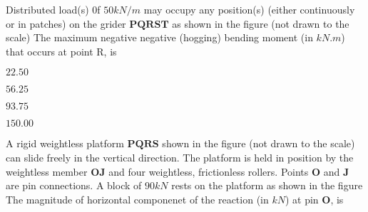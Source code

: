 \item Distributed load(s) 0f $ 50 k N/m $ may occupy any position(s) (either continuously or in patches) on the grider $\textbf{PQRST}$ as shown in the figure (not drawn to the scale)
The maximum negative negative (hogging) bending moment (in $k N. m$) that occurs at point R, is 
\begin{center}
\end{center}

\begin{enumerate}
\begin{multicols}{4}
    \item $22.50$
    \item $56.25$
    \item $93.75$
    \item $150.00$
\end{multicols}
\end{enumerate}
\item A rigid weightless platform $\textbf{PQRS}$ shown in the figure (not drawn to the scale)  can slide freely in the vertical direction. The platform is held in position by the weightless member $\textbf{OJ}$ and four weightless, frictionless rollers. Points $\textbf{O}$ and $ \textbf{J} $ are pin connections. A block of $90 kN $ rests on the platform as shown in the figure
The magnitude of horizontal componenet of the reaction (in $kN$) at pin $\textbf{O}$, is 


